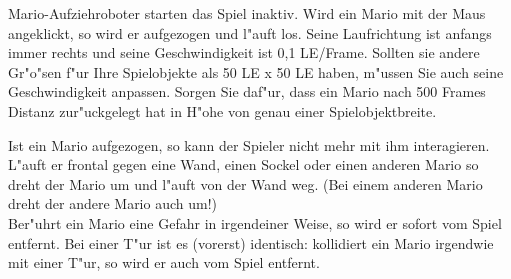 Mario-Aufziehroboter starten das Spiel inaktiv. Wird ein Mario mit der Maus angeklickt, so wird er aufgezogen und l"auft los. Seine Laufrichtung ist anfangs immer rechts und seine Geschwindigkeit ist 0,1 LE/Frame. Sollten sie andere Gr"o"sen f"ur Ihre Spielobjekte als 50 LE x 50 LE haben, m"ussen Sie auch seine Geschwindigkeit anpassen. 
Sorgen Sie daf"ur, dass ein Mario nach 500 Frames Distanz zur"uckgelegt hat in H"ohe von genau einer Spielobjektbreite.

Ist ein Mario aufgezogen, so kann der Spieler nicht mehr mit ihm interagieren. 
L"auft er frontal gegen eine Wand, einen Sockel oder einen anderen Mario so dreht der Mario um und l"auft von der Wand weg. (Bei einem anderen Mario dreht der andere Mario auch um!)\\
Ber"uhrt ein Mario eine Gefahr in irgendeiner Weise, so wird er sofort vom Spiel entfernt. 
Bei einer T"ur ist es (vorerst) identisch: kollidiert ein Mario irgendwie mit einer T"ur, so wird er auch vom Spiel entfernt.